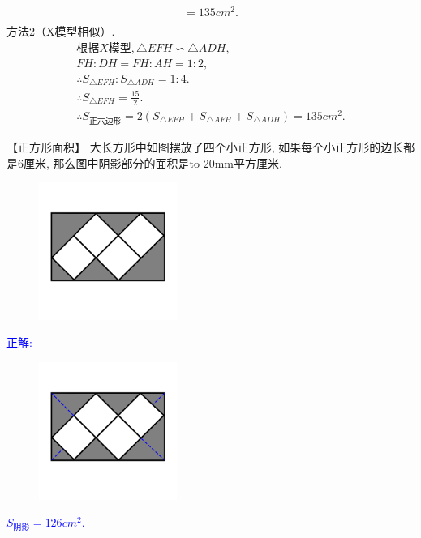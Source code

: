 {{\begin{gather*}
                = 135 {cm}^2.\\
            \end{gather*}
            方法2（X模型相似）.\\
            \begin{gather*}
                根据X模型, \triangle EFH \backsim \triangle ADH, \\
                FH:DH = FH:AH = 1:2, \\
                \therefore S_{\triangle EFH} : S_{\triangle ADH}= 1:4.  \\
                \therefore S_{\triangle EFH}=\frac{15}{2} .\\
                \therefore S_{正六边形} = 2(S_{\triangle EFH} + S_{\triangle AFH} + S_{\triangle ADH}) = 135 {cm}^2.
            \end{gather*}
        }
    \else
        \vspace{1cm}
    \fi
}

\item {
    【正方形面积】
    大长方形中如图摆放了四个小正方形, 如果每个小正方形的边长都是6厘米, 那么图中阴影部分的面积是\underline{\hbox to 20mm{}}平方厘米.
    \begin{figure}[H] 
        \centering
        \includegraphics[width=0.4\textwidth]{./pics/Chapter_2/19.png}
    \end{figure}
    \ifshowSolution 
        \fangsong{}\textcolor{blue}{
            正解: \\
            \begin{figure}[H] 
                \centering
                \includegraphics[width=0.4\textwidth]{./pics/Chapter_2/seikai_19.png}
            \end{figure}
            $S_{阴影} = 126 {cm}^2$.
        }
    \else
        \vspace{1cm}
    \fi
}

